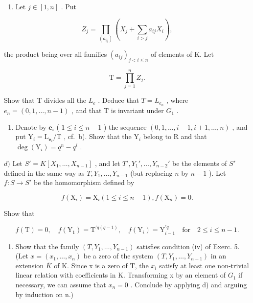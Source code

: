 \begin{enumerate}
\def\labelenumi{\alph{enumi})}
\setcounter{enumi}{1}
\tightlist
\item
  Let \(j \in [1, n]\) . Put
\end{enumerate}

\[
Z _ {j} = \prod_ {(a _ {i j})} (X _ {j} + \sum_ {i > j} a _ {i j} X _ {i}),
\]

the product being over all families \((a_{ij})_{j < i\leqslant n}\) of elements of K. Let

\[
\mathrm{T} = \prod_ {j = 1} ^ {n} Z _ {j}.
\]

Show that T divides all the \(L_{e}\) . Deduce that \(T = L_{e_{n}}\) , where \(e_{n} = (0, 1, \ldots, n - 1)\) , and that T is invariant under \(G_{1}\) .

\begin{enumerate}
\def\labelenumi{\alph{enumi})}
\setcounter{enumi}{2}
\tightlist
\item
  Denote by \(\mathbf{e}_i\) ( \(1 \leqslant i \leqslant n - 1\) ) the sequence \((0, 1, \ldots, i - 1, i + 1, \ldots, n)\) , and put \(\mathrm{Y}_i = \mathrm{L}_{\mathbf{e}_i} / \mathrm{T}\) , cf.~b). Show that the \(\mathrm{Y}_i\) belong to R and that \(\deg(\mathrm{Y}_i) = q^n - q^i\) .
\end{enumerate}

\(d)\) Let \(S' = K[X_1, \ldots, X_{n-1}]\) , and let \(T', Y_1', \ldots, Y_{n-2}'\) be the elements of \(S'\) defined in the same way as \(T, Y_1, \ldots, Y_{n-1}\) (but replacing \(n\) by \(n-1\) ). Let \(f: S \to S'\) be the homomorphism defined by

\[
f \left(\mathrm{X} _ {i}\right) = \mathrm{X} _ {i} (1 \leqslant i \leqslant n - 1), f \left(\mathrm{X} _ {n}\right) = 0.
\]

Show that

\[
f (\mathrm{T}) = 0, \quad f (\mathrm{Y} _ {1}) = \mathrm{T} ^ {\prime q (q - 1)}, \quad f (\mathrm{Y} _ {i}) = \mathrm{Y} _ {i - 1} ^ {\prime q} \quad \text{for} \quad 2 \leqslant i \leqslant n - 1.
\]

\begin{enumerate}
\def\labelenumi{\alph{enumi})}
\setcounter{enumi}{4}
\tightlist
\item
  Show that the family \((T, Y_{1}, \ldots, Y_{n-1})\) satisfies condition (iv) of Exerc. 5. (Let \(x = (x_{1}, \ldots, x_{n})\) be a zero of the system \((T, Y_{1}, \ldots, Y_{n-1})\) in an extension \(\overline{K}\) of K. Since x is a zero of T, the \(x_{i}\) satisfy at least one non-trivial linear relation with coefficients in K. Transforming x by an element of \(G_{1}\) if necessary, we can assume that \(x_{n} = 0\) . Conclude by applying d) and arguing by induction on n.)
\end{enumerate}

